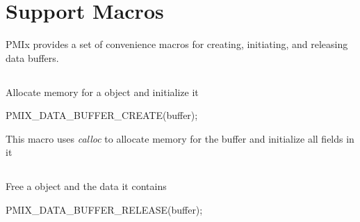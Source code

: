 \section{Support Macros}
\label{chap:datamgt:macros}

\ac{PMIx} provides a set of convenience macros for creating, initiating, and releasing data buffers.

\subsection{}

\summary

Allocate memory for a  object and initialize it

\format

\begin{signature}{2.0}
PMIX_DATA_BUFFER_CREATE(buffer);
\end{signature}

\begin{arglist}
\end{arglist}

\descr

This macro uses \textit{calloc} to allocate memory for the buffer and initialize all fields in it


\subsection{}

\summary

Free a  object and the data it contains

\format

\begin{signature}{2.0}
PMIX_DATA_BUFFER_RELEASE(buffer);
\end{signature}

\begin{arglist}
\end{arglist}

